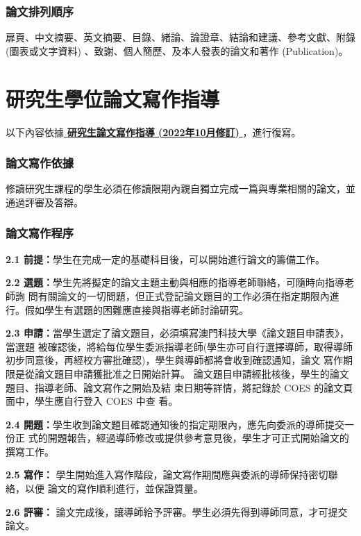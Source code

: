 \documentclass[
    writingLanguage=chinese, %
    addPageTitle=on,  %
    addDeclaration=on, %
    addMUSTlog=off, %
    addFigTOC=on, %
    addTabTOC=on, %
    refIndent=off, %
    printMod=off, %
]{must}
\begin{document}
\addinfo
\subsection{論文排列順序}
扉頁、中文摘要、英文摘要、目錄、緒論、論證章、結論和建議、參考文獻、附錄
(圖表或文字資料) 、致謝、個人簡歷、及本人發表的論文和著作 (Publication)。






\chapter{研究生學位論文寫作指導}
\noindent 以下內容依據\href{https://www.must.edu.mo/images/GSO/files/sgsdocument/GS002.pdf}{\textbf{ 研究生論文寫作指導 (2022年10月修訂) }}，進行復寫。

\subsection{論文寫作依據}
修讀研究生課程的學生必須在修讀限期內親自獨立完成一篇與專業相關的論文，並通過評審及答辯。
\subsection{論文寫作程序}

\noindent \textbf{2.1 前提：}學生在完成一定的基礎科目後，可以開始進行論文的籌備工作。

\noindent \textbf{2.2 選題：}學生先將擬定的論文主題主動與相應的指導老師聯絡，可隨時向指導老師詢
問有關論文的一切問題，但正式登記論文題目的工作必須在指定期限內進
行。假如學生有選題的困難應直接與指導老師討論研究。

\noindent \textbf{2.3 申請：}當學生選定了論文題目，必須填寫澳門科技大學《論文題目申請表》，當選題
被確認後，將給每位學生委派指導老師(學生亦可自行選擇導師，取得導師
初步同意後，再經校方審批確認)，學生與導師都將會收到確認通知，論文
寫作期限是從論文題目申請獲批准之日開始計算。
 論文題目申請經批核後，學生的論文題目、指導老師、論文寫作之開始及結
束日期等詳情，將記錄於 COES 的論文頁面中，學生應自行登入 COES 中查
看。

\noindent \textbf{2.4 開題：}學生收到論文題目確認通知後的指定期限內，應先向委派的導師提交一份正
式的開題報告，經過導師修改或提供參考意見後，學生才可正式開始論文的
撰寫工作。

\noindent \textbf{2.5 寫作：} 學生開始進入寫作階段，論文寫作期間應與委派的導師保持密切聯絡，以便
論文的寫作順利進行，並保證質量。

\noindent \textbf{2.6 評審：} 論文完成後，讓導師給予評審。學生必須先得到導師同意，才可提交論文。
\end{document}
